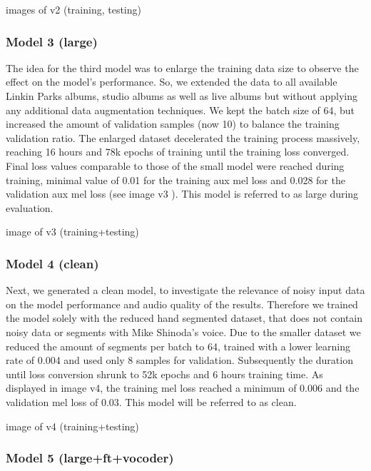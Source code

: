 \documentclass[a4paper]{article}
\begin{document}
	\color{red}images of v2 (training, testing)\color{black} 
	
	\subsubsection{Model 3 (large)}
	
	The idea for the third model was to enlarge the training data size to observe the effect on the model’s performance. So, we extended the data to all available Linkin Parks albums, studio albums as well as live albums but without applying any additional data augmentation techniques. We kept the batch size of 64, but increased the amount of validation samples (now 10) to balance the training validation ratio. The enlarged dataset decelerated the training process massively, reaching 16 hours and 78k epochs of training until the training loss converged. Final loss values comparable to those of the small model were reached during training, minimal value of 0.01 for the training aux mel loss and 0.028 for the validation aux mel loss (see image \color{red}v3\color{black} ). This model is referred to as large during evaluation. 
	
	\color{red}image of v3 (training+testing)\color{black}
	
	\subsubsection{Model 4 (clean)}
	
	Next, we generated a clean model, to investigate the relevance of noisy input data on the model performance and audio quality of the results. Therefore we trained the model solely with the reduced hand segmented dataset, that does not contain noisy data or segments with Mike Shinoda’s voice. Due to the smaller dataset we reduced the amount of segments per batch to 64, trained with a lower learning rate of 0.004 and used only 8 samples for validation. Subsequently the duration until loss conversion shrunk to 52k epochs and 6 hours training time. As displayed in image \color{red}v4\color{black}, the training mel loss reached a minimum of 0.006 and the validation mel loss of 0.03. This model will be referred to as clean.
	
	\color{red}image of v4 (training+testing)\color{black}
	
	\subsubsection{Model 5 (large+ft+vocoder)}
	
\end{document}
